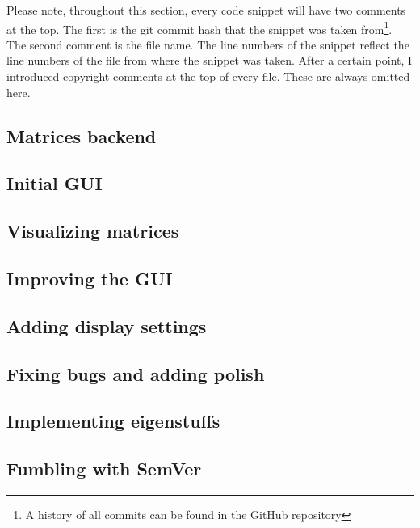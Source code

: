 \documentclass[../main.tex]{subfiles}
\begin{document}
Please note, throughout this section, every code snippet will have two comments at the top. The first is the git commit hash that the snippet was taken from\footnote{A history of all commits can be found in the GitHub repository\cite{lintrans-github}}. The second comment is the file name. The line numbers of the snippet reflect the line numbers of the file from where the snippet was taken. After a certain point, I introduced copyright comments at the top of every file. These are always omitted here.

\subsection{Matrices backend\label{development:matrices-backend}}


\newpage

\subsection{Initial GUI\label{development:initial-gui}}


\newpage

\subsection{Visualizing matrices\label{development:visualizing-matrices}}


\newpage

\subsection{Improving the GUI\label{development:improving-the-gui}}


\newpage

\subsection{Adding display settings\label{development:adding-display-settings}}


\newpage

\subsection{Fixing bugs and adding polish\label{development:fixing-bugs-and-adding-polish}}


\newpage

\subsection{Implementing eigenstuffs\label{development:implementing-eigenstuffs}}


\newpage

\subsection{Fumbling with SemVer\label{development:fumbling-with-semver}}

\end{document}

